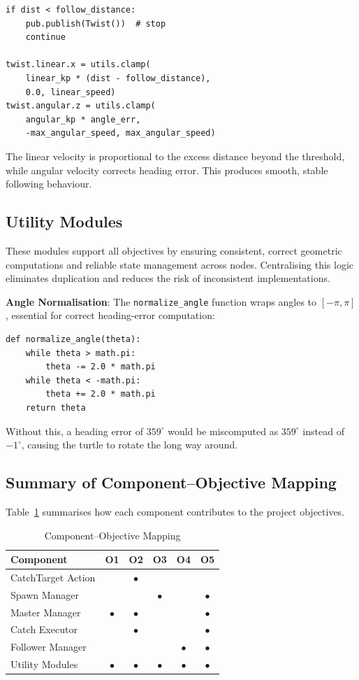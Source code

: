 \documentclass{article}
\begin{document}
\begin{homeworkProblem}[3]
\begin{verbatim}
if dist < follow_distance:
    pub.publish(Twist())  # stop
    continue

twist.linear.x = utils.clamp(
    linear_kp * (dist - follow_distance),
    0.0, linear_speed)
twist.angular.z = utils.clamp(
    angular_kp * angle_err,
    -max_angular_speed, max_angular_speed)
\end{verbatim}

The linear velocity is proportional to the excess distance beyond the threshold, while angular velocity corrects heading error. This produces smooth, stable following behaviour.

\subsection{Utility Modules}

These modules support all objectives by ensuring consistent, correct geometric computations and reliable state management across nodes. Centralising this logic eliminates duplication and reduces the risk of inconsistent implementations.

\textbf{Angle Normalisation}: The \texttt{normalize\_angle} function wraps angles to $[-\pi, \pi]$, essential for correct heading-error computation:

\begin{verbatim}
def normalize_angle(theta):
    while theta > math.pi:
        theta -= 2.0 * math.pi
    while theta < -math.pi:
        theta += 2.0 * math.pi
    return theta
\end{verbatim}

Without this, a heading error of $359^\circ$ would be miscomputed as $359^\circ$ instead of $-1^\circ$, causing the turtle to rotate the long way around.

\subsection{Summary of Component--Objective Mapping}

Table~\ref{tab:mapping} summarises how each component contributes to the project objectives.

\begin{table}[H]
\centering
\caption{Component--Objective Mapping}
\label{tab:mapping}
\begin{tabular}{lccccc}
\toprule
\textbf{Component} & \textbf{O1} & \textbf{O2} & \textbf{O3} & \textbf{O4} & \textbf{O5} \\
\midrule
CatchTarget Action & & $\bullet$ & & & \\
Spawn Manager & & & $\bullet$ & & $\bullet$ \\
Master Manager & $\bullet$ & $\bullet$ & & & $\bullet$ \\
Catch Executor & & $\bullet$ & & & $\bullet$ \\
Follower Manager & & & & $\bullet$ & $\bullet$ \\
Utility Modules & $\bullet$ & $\bullet$ & $\bullet$ & $\bullet$ & $\bullet$ \\
\bottomrule
\end{tabular}
\end{table}

\end{homeworkProblem}
\end{document}
